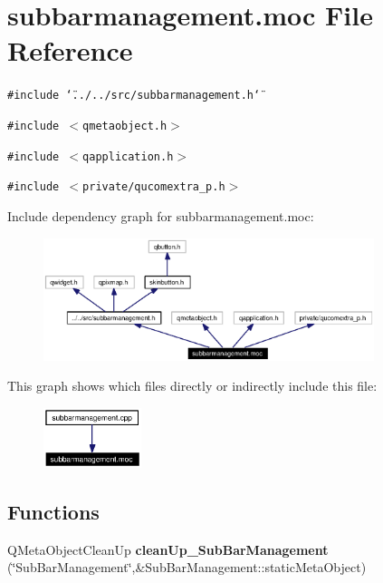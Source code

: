 \section{subbarmanagement.moc File Reference}
\label{subbarmanagement_8moc}


{\tt \#include \char`\"{}../../src/subbarmanagement.h\char`\"{}}\par
{\tt \#include $<$qmetaobject.h$>$}\par
{\tt \#include $<$qapplication.h$>$}\par
{\tt \#include $<$private/qucomextra\_\-p.h$>$}\par


Include dependency graph for subbarmanagement.moc:\begin{figure}[H]
\begin{center}
\leavevmode
\includegraphics[width=274pt]{subbarmanagement_8moc__incl}
\end{center}
\end{figure}


This graph shows which files directly or indirectly include this file:\begin{figure}[H]
\begin{center}
\leavevmode
\includegraphics[width=81pt]{subbarmanagement_8moc__dep__incl}
\end{center}
\end{figure}
\subsection*{Functions}
\begin{CompactItemize}
\item 
QMeta\-Object\-Clean\-Up {\bf clean\-Up\_\-Sub\-Bar\-Management} (\char`\"{}Sub\-Bar\-Management\char`\"{},\&Sub\-Bar\-Management::static\-Meta\-Object)
\end{CompactItemize}



